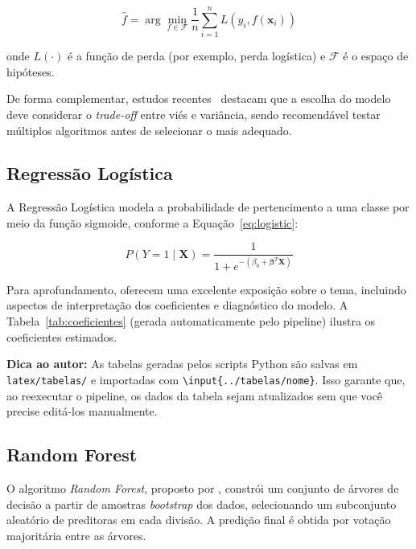 \documentclass[
    article,
    12pt,
    oneside,
    a4paper,
    english,
    brazilian
    ]{abntex2}
\numberwithin{equation}{section}
\newenvironment{dica}{%
    \par\medskip
    \color{blue!60!black}\small\itshape
}{%
    \par\medskip
}
\begin{document}
\begin{equation}
    \hat{f} = \arg\min_{f \in \mathcal{F}} \frac{1}{n} \sum_{i=1}^{n} L(y_i, f(\mathbf{x}_i))
    \label{eq:risco_empirico}
\end{equation}

onde $L(\cdot)$ é a função de perda (por exemplo, perda logística) e $\mathcal{F}$ é o espaço de hipóteses.

De forma complementar, estudos recentes~\cite{pecanha2024} destacam que a escolha do modelo deve considerar o \textit{trade-off} entre viés e variância, sendo recomendável testar múltiplos algoritmos antes de selecionar o mais adequado.

\subsection{Regressão Logística}

A Regressão Logística modela a probabilidade de pertencimento a uma classe por meio da função sigmoide, conforme a Equação~\ref{eq:logistic}:

\begin{equation}
    P(Y = 1 \mid \mathbf{X}) = \frac{1}{1 + e^{-(\beta_0 + \boldsymbol{\beta}^T \mathbf{X})}}
    \label{eq:logistic}
\end{equation}

Para aprofundamento,  oferecem uma excelente exposição sobre o tema, incluindo aspectos de interpretação dos coeficientes e diagnóstico do modelo. A Tabela~\ref{tab:coeficientes} (gerada automaticamente pelo pipeline) ilustra os coeficientes estimados.



\begin{dica}
\noindent\textbf{Dica ao autor:} As tabelas geradas pelos scripts Python são salvas em \texttt{latex/tabelas/} e importadas com \texttt{\textbackslash input\{../tabelas/nome\}}. Isso garante que, ao reexecutar o pipeline, os dados da tabela sejam atualizados sem que você precise editá-los manualmente.
\end{dica}

\subsection{Random Forest}

O algoritmo \textit{Random Forest}, proposto por , constrói um conjunto de árvores de decisão a partir de amostras \textit{bootstrap} dos dados, selecionando um subconjunto aleatório de preditoras em cada divisão. A predição final é obtida por votação majoritária entre as árvores.
\end{document}
